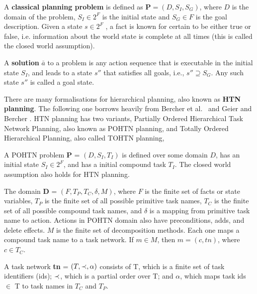 \documentclass[runningheads]{llncs}
\begin{document}
A \textbf{classical planning problem} is defined as $\textbf{P} = (D, S_I, S_G)$, 
where $D$ is the domain of the problem, 
$S_I \in 2^F$ is the initial state and $S_G \in F$ is the goal description.
Given a state $s \in 2^F$ , a fact is known for certain to be either true or false, i.e. information about the world state is complete at all times (this is called the closed world assumption).

A \textbf{solution} $\bar{a}$ to a problem is any action sequence that is executable in the initial state $S_I$, and leads to a state $s''$ that satisfies all
goals, i.e., $s'' \supseteq S_G$. Any such state $s''$ is called a goal state.


There are many formalisations for hierarchical planning, also known as \textbf{HTN planning}. The following one borrows heavily from Bercher et al.\ \cite{HTNSurvey} and Geier and Bercher \cite{Geier2011TIHTNDecidability}. HTN planning has two variants, Partially Ordered Hierarchical Task Network Planning, also known as POHTN planning, and Totally Ordered Hierarchical Planning, also called TOHTN planning,   %

A POHTN problem \textbf{P} = $(D, S_I, T_I)$
is defined over some domain $D$, 
has an initial state $S_I \in 2^F$, and 
has a initial compound task $T_I$. 
The closed world assumption also holds for HTN planning.

The domain \textbf{D} = $(F, T_P, T_C, \delta, M)$, where
$F$ is the finite set of facts or state variables, $T_P$ is the finite set of all possible primitive task names, $T_C$ is the finite set of all possible compound task names, and
$\delta$ is a mapping from primitive task name to action. Actions in POHTN domain also have preconditions, adds, and delete effects.
$M$ is the finite set of decomposition methods. Each one maps a compound task name to a task network. If $m \in M$, then $m=(c, tn)$, where $c \in T_C$.

A task network \textbf{tn} = $(T, \mathit{ \mathord{\prec} }, \alpha)$ consists of
T, which is a finite set of task identifiers (ids); 
$\mathit{ \mathord{\prec} }$, which is a partial order over T; and
$\alpha$, which maps task ids $\in$ T to task names in $T_C$ and $T_P$. 
\end{document}
